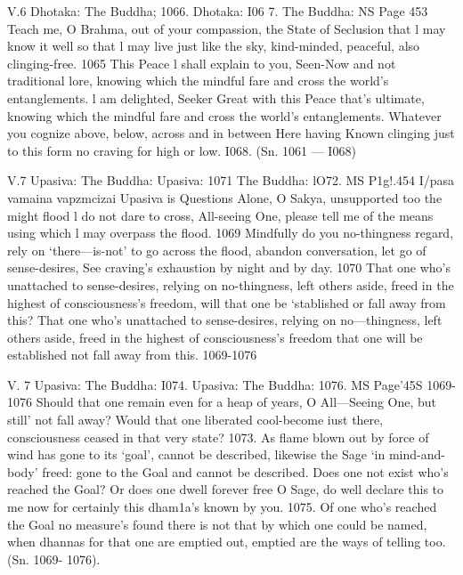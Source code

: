    
   
   V.6
   Dhotaka:
   The Buddha;
   1066.
   Dhotaka:
   I06 7.
   The Buddha:
   NS Page 453
   Teach me, O Brahma, out of your compassion,
   the State of Seclusion that l may know it well
   so that l may live just like the sky,
   kind-minded, peaceful, also clinging-free. 1065
   This Peace l shall explain to you,
   Seen-Now and not traditional lore,
   knowing which the mindful fare
   and cross the world's entanglements.
   l am delighted, Seeker Great
   with this Peace that's ultimate,
   knowing which the mindful fare
   and cross the world's entanglements.
   Whatever you cognize above,
   below, across and in between
   Here having Known clinging just to this
   form no craving for high or low. I068.
   (Sn. 1061 — I068)
   
   
   
   V.7
   Upasiva:
   The Buddha:
   Upasiva:
   1071
   The Buddha:
   lO72.
   MS P1g!.454
   I/pasa vamaina vapzmcizai
   Upasiva is Questions
   Alone, O Sakya, unsupported too
   the might ﬂood l do not dare to cross,
   All-seeing One, please tell me of the means
   using which l may overpass the ﬂood. 1069
   Mindfully do you no-thingness regard,
   rely on `there—is-not' to go across the ﬂood,
   abandon conversation, let go of sense-desires,
   See craving's exhaustion by night and by day. 1070
   That one who's unattached to sense-desires,
   relying on no-thingness, left others aside,
   freed in the highest of consciousness's freedom,
   will that one be `stablished or fall away from this?
   That one who's unattached to sense-desires,
   relying on no—thingness, left others aside,
   freed in the highest of consciousness's freedom
   that one will be established not fall away from this.
   1069-1076
   
   
   
   V. 7
   Upasiva:
   The Buddha:
   I074.
   Upasiva:
   The Buddha:
   1076.
   MS Page'45S
   1069-1076
   Should that one remain even for a heap of years,
   O All—Seeing One, but still' not fall away?
   Would that one liberated cool-become iust there,
   consciousness ceased in that very state? 1073.
   As ﬂame blown out by force of wind
   has gone to its `goal', cannot be described,
   likewise the Sage `in mind-and-body' freed:
   gone to the Goal and cannot be described.
   Does one not exist who's reached the Goal?
   Or does one dwell forever free
   O Sage, do well declare this to me now
   for certainly this dham1a's known by you. 1075.
   Of one who's reached the Goal no measure's found
   there is not that by which one could be named,
   when dhannas for that one are emptied out,
   emptied are the ways of telling too.
   (Sn. 1069- 1076).
   
